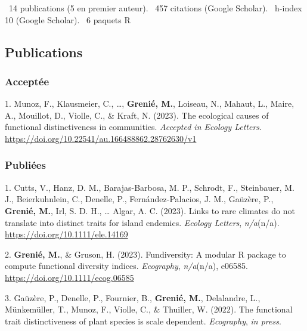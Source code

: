 \documentclass[10pt,a4paper,]{article}
\begin{document}
\faFile*~14 publications (5 en premier auteur). \faQuoteLeft~457
citations (Google Scholar). \faHSquare~h-index 10 (Google Scholar).
\faRProject~6 paquets R

\hypertarget{publications}{%
\subsection{Publications}\label{publications}}

\hypertarget{acceptuxe9e}{%
\subsubsection{Acceptée}\label{acceptuxe9e}}

\hypertarget{bibliography}{}
\leavevmode{}%
1. Munoz, F., Klausmeier, C., \ldots, \textbf{Grenié, M.}, Loiseau, N.,
Mahaut, L., Maire, A., Mouillot, D., Violle, C., \& Kraft, N. (2023).
The ecological causes of functional distinctiveness in communities.
\emph{Accepted in Ecology Letters}.
\url{https://doi.org/10.22541/au.166488862.28762630/v1}

\hypertarget{publiuxe9es}{%
\subsubsection{Publiées}\label{publiuxe9es}}

\hypertarget{bibliography}{}
\leavevmode{}%
1. Cutts, V., Hanz, D. M., Barajas-Barbosa, M. P., Schrodt, F.,
Steinbauer, M. J., Beierkuhnlein, C., Denelle, P., Fernández-Palacios,
J. M., Gaüzère, P., \textbf{Grenié, M.}, Irl, S. D. H., \ldots{} Algar,
A. C. (2023). Links to rare climates do not translate into distinct
traits for island endemics. \emph{Ecology Letters}, \emph{n/a}(n/a).
\url{https://doi.org/10.1111/ele.14169}

\leavevmode{}%
2. \textbf{Grenié, M.}, \& Gruson, H. (2023). Fundiversity: A modular R
package to compute functional diversity indices. \emph{Ecography},
\emph{n/a}(n/a), e06585. \url{https://doi.org/10.1111/ecog.06585}

\leavevmode{}%
3. Gaüzère, P., Denelle, P., Fournier, B., \textbf{Grenié, M.},
Delalandre, L., Münkemüller, T., Munoz, F., Violle, C., \& Thuiller, W.
(2022). The functional trait distinctiveness of plant species is scale
dependent. \emph{Ecography}, \emph{in press}.
\end{document}
